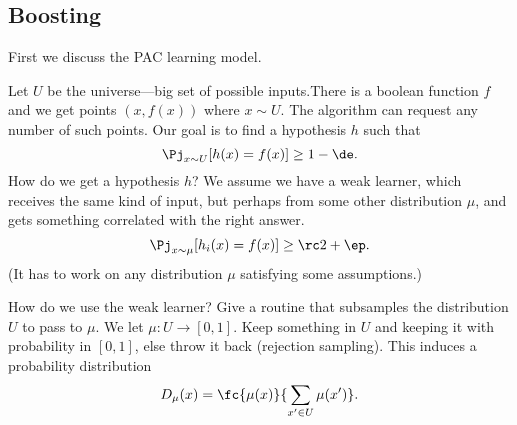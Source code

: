 \subsection{Boosting}

First we discuss the PAC learning model.

Let $U$ be the universe---big set of possible inputs.There is a boolean function $f$ and we get points $(x,f(x))$ where $x\sim U$. The algorithm can request any number of such points. Our goal is to find a hypothesis $h$ such that 
$$
\Pj_{x\sim U} [h(x)=f(x)]\ge 1-\de.
$$
How do we get a hypothesis $h$? We assume we have a weak learner, which receives the same kind of input, but perhaps from some other distribution $\mu$, and gets something correlated with the right answer.
$$
\Pj_{x\sim \mu} [h_i(x)=f(x)] \ge \rc 2+\ep.
$$
(It has to work on any distribution $\mu$ satisfying some assumptions.)

How do we use the weak learner?
Give a routine that subsamples the distribution $U$ to pass to $\mu$. 
We let $\mu:U\to [0,1]$. Keep something in $U$ and keeping it with probability in $[0,1]$, else throw it back (rejection sampling). This induces a probability distribution
$$
D_\mu(x) = \fc{\mu(x)}{\sum_{x'\in U}\mu(x')}.
$$


